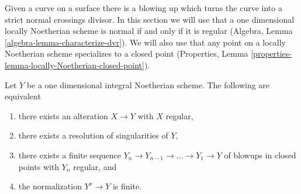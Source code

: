 \noindent
Given a curve on a surface there is a blowing up which turns the
curve into a strict normal crossings divisor. In this section we
will use that a one dimensional locally Noetherian scheme is normal if
and only if it is regular
(Algebra, Lemma \ref{algebra-lemma-characterize-dvr}).
We will also use that any point on a locally Noetherian
scheme specializes to a closed point
(Properties, Lemma \ref{properties-lemma-locally-Noetherian-closed-point}).

\begin{lemma}
\label{lemma-resolve-curve}
Let $Y$ be a one dimensional integral Noetherian scheme.
The following are equivalent
\begin{enumerate}
\item there exists an alteration $X \to Y$ with $X$ regular,
\item there exists a resolution of singularities of $Y$,
\item there exists a finite sequence
$Y_n \to Y_{n - 1} \to \ldots \to Y_1 \to Y$ of blowups
in closed points with $Y_n$ regular, and
\item the normalization $Y^\nu \to Y$ is finite.
\end{enumerate}
\end{lemma}

